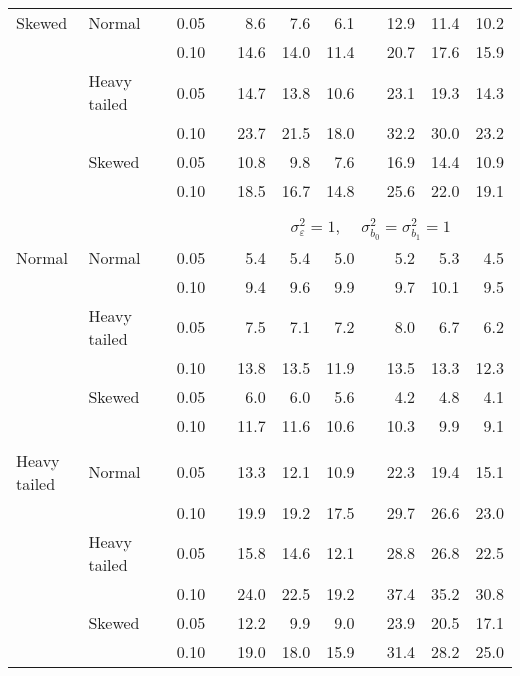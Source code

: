 \begin{table}[ht]
\begin{scriptsize}
\begin{center}
\begin{tabular}{ll p{.1cm} c p{.1cm} rrr p{.1cm} rrr}
Skewed       & Normal       && 0.05 &&   8.6 & 7.6 & 6.1 &   & 12.9 & 11.4 & 10.2 \\ 
             &              && 0.10 &&   14.6 & 14.0 & 11.4 &   & 20.7 & 17.6 & 15.9 \\ 
             & Heavy tailed && 0.05 &&   14.7 & 13.8 & 10.6 &   & 23.1 & 19.3 & 14.3 \\ 
             &              && 0.10 &&   23.7 & 21.5 & 18.0 &   & 32.2 & 30.0 & 23.2 \\ 
             & Skewed       && 0.05 &&   10.8 & 9.8 & 7.6 &   & 16.9 & 14.4 & 10.9 \\ 
             &              && 0.10 &&   18.5 & 16.7 & 14.8 &   & 25.6 & 22.0 & 19.1 \\ 

&&&&&&&&&&&\\
& && && \multicolumn{7}{c}{$\sigma_{\varepsilon}^2 = 1$, \ \ $\sigma_{b_0}^2 = \sigma_{b_1}^2 = 1$} \\ \cline{6-12}
\rowcolor{gray!20}Normal       & Normal       && 0.05 &&   5.4 & 5.4 & 5.0 &   & 5.2 & 5.3 & 4.5 \\ 
\rowcolor{gray!20}             &              && 0.10 &&   9.4 & 9.6 & 9.9 &   & 9.7 & 10.1 & 9.5 \\ 
\rowcolor{gray!20}             & Heavy tailed && 0.05 &&   7.5 & 7.1 & 7.2 &   & 8.0 & 6.7 & 6.2 \\ 
\rowcolor{gray!20}             &              && 0.10 &&   13.8 & 13.5 & 11.9 &   & 13.5 & 13.3 & 12.3 \\ 
\rowcolor{gray!20}             & Skewed       && 0.05 &&   6.0 & 6.0 & 5.6 &   & 4.2 & 4.8 & 4.1 \\ 
\rowcolor{gray!20}             &              && 0.10 &&   11.7 & 11.6 & 10.6 &   & 10.3 & 9.9 & 9.1 \\ 
&&&&&&&&&&&\\
Heavy tailed & Normal       && 0.05 &&   13.3 & 12.1 & 10.9 &   & 22.3 & 19.4 & 15.1 \\ 
             &              && 0.10 &&   19.9 & 19.2 & 17.5 &   & 29.7 & 26.6 & 23.0 \\ 
             & Heavy tailed && 0.05 &&   15.8 & 14.6 & 12.1 &   & 28.8 & 26.8 & 22.5 \\ 
             &              && 0.10 &&   24.0 & 22.5 & 19.2 &   & 37.4 & 35.2 & 30.8 \\ 
             & Skewed       && 0.05 &&   12.2 & 9.9 & 9.0 &   & 23.9 & 20.5 & 17.1 \\ 
             &              && 0.10 &&   19.0 & 18.0 & 15.9 &   & 31.4 & 28.2 & 25.0 \\ 

\end{tabular}
\end{center}
\end{scriptsize}
\end{table}
